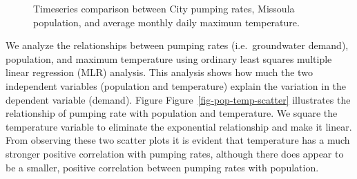 \documentclass[
  letterpaper,
  DIV=11,
  numbers=noendperiod]{scrartcl}
\begin{document}
\begin{figure}


\caption{\label{fig-pr-pop-temp}Timeseries comparison between City
pumping rates, Missoula population, and average monthly daily maximum
temperature.}

\end{figure}%

We analyze the relationships between pumping rates (i.e.~groundwater
demand), population, and maximum temperature using ordinary least
squares multiple linear regression (MLR) analysis. This analysis shows
how much the two independent variables (population and temperature)
explain the variation in the dependent variable (demand). Figure
Figure~\ref{fig-pop-temp-scatter} illustrates the relationship of
pumping rate with population and temperature. We square the temperature
variable to eliminate the exponential relationship and make it linear.
From observing these two scatter plots it is evident that temperature
has a much stronger positive correlation with pumping rates, although
there does appear to be a smaller, positive correlation between pumping
rates with population.
\end{document}
